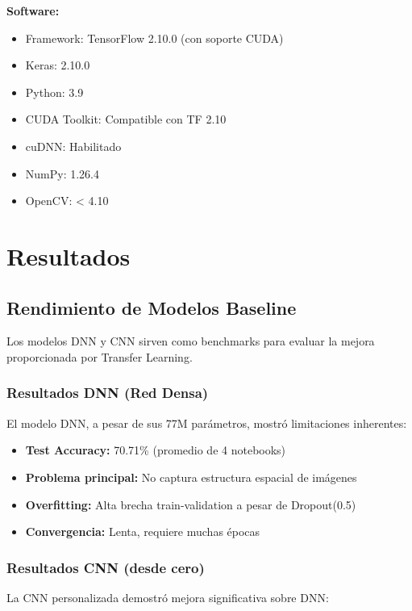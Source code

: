 \documentclass[11pt, a4paper]{article}
\begin{document}
\textbf{Software:}
\begin{itemize}
    \item Framework: TensorFlow 2.10.0 (con soporte CUDA)
    \item Keras: 2.10.0
    \item Python: 3.9
    \item CUDA Toolkit: Compatible con TF 2.10
    \item cuDNN: Habilitado
    \item NumPy: 1.26.4
    \item OpenCV: < 4.10
\end{itemize}

\section{Resultados}

\subsection{Rendimiento de Modelos Baseline}

Los modelos DNN y CNN sirven como benchmarks para evaluar la mejora proporcionada por Transfer Learning.

\subsubsection{Resultados DNN (Red Densa)}

El modelo DNN, a pesar de sus 77M parámetros, mostró limitaciones inherentes:

\begin{itemize}
    \item \textbf{Test Accuracy:} 70.71\% (promedio de 4 notebooks)
    \item \textbf{Problema principal:} No captura estructura espacial de imágenes
    \item \textbf{Overfitting:} Alta brecha train-validation a pesar de Dropout(0.5)
    \item \textbf{Convergencia:} Lenta, requiere muchas épocas
\end{itemize}

\subsubsection{Resultados CNN (desde cero)}

La CNN personalizada demostró mejora significativa sobre DNN:
\end{document}
